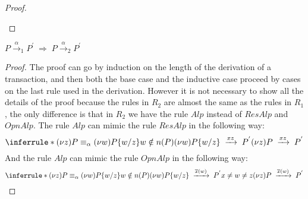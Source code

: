 \begin{theorem}
\begin{proof}
\begin{description}
\begin{description}
	\end{description}
    \end{description}
  \end{proof}
\end{theorem}



\begin{theorem}
  $P\xrightarrow{\alpha}_{1}P^{'}\; \Rightarrow\; P\xrightarrow{\alpha}_{2}P^{'}$
  \begin{proof}
    The proof can go by induction on the length of the derivation of a transaction, and then both the base case and the inductive case proceed by cases on the last rule used in the derivation. However it is not necessary to show all the details of the proof because the rules in $R_{2}$ are almost the same as the rules in $R_{1}$, the only difference is that in $R_{2}$ we have the rule $Alp$ instead of $ResAlp$ and $OpnAlp$. The rule $Alp$ can mimic the rule $ResAlp$ in the following way:
	\[
	  \inferrule *{
	      (\nu z)P\equiv_{\alpha} (\nu w)P\{w/z\}
	    \\
	      w\notin n(P)
	    \\
	      (\nu w)P\{w/z\}\;
		\xrightarrow{xz}\;
		  P^{'}
	  }{
	    (\nu z)P\; 
	      \xrightarrow{xz}\;
		P^{'}
	  }
	\]
	And the rule $Alp$ can mimic the rule $OpnAlp$ in the following way:
	\[
	  \inferrule *{
	      (\nu z)P\equiv_{\alpha} (\nu w)P\{w/z\}
	    \\
	      w\notin n(P)
	    \\
	      (\nu w)P\{w/z\}\;
		\xrightarrow{\overline{x}(w)}\;
		  P^{'}
	    \\
	      x\neq w\neq z
	  }{
	    (\nu z)P\; 
	      \xrightarrow{\overline{x}(w)}\;
		P^{'}
	  }
	\]
  \end{proof}
\end{theorem}


